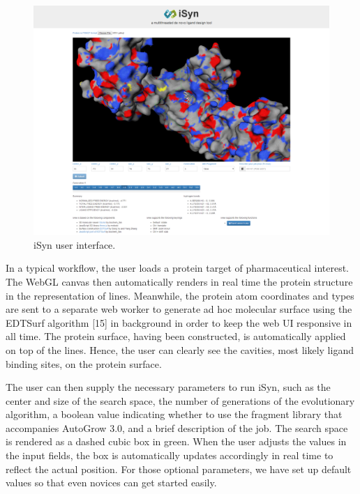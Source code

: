 \begin{figure}
\begin{center}
\includegraphics[width=\linewidth]{../isyn/UI.png}
\end{center}
\caption{iSyn user interface.}
\label{fig:UI}
\end{figure}

In a typical workflow, the user loads a protein target of pharmaceutical interest. The WebGL canvas then automatically renders in real time the protein structure in the representation of lines. Meanwhile, the protein atom coordinates and types are sent to a separate web worker to generate ad hoc molecular surface using the EDTSurf algorithm [15] in background in order to keep the web UI responsive in all time. The protein surface, having been constructed, is automatically applied on top of the lines. Hence, the user can clearly see the cavities, most likely ligand binding sites, on the protein surface.

The user can then supply the necessary parameters to run iSyn, such as the center and size of the search space, the number of generations of the evolutionary algorithm, a boolean value indicating whether to use the fragment library that accompanies AutoGrow 3.0, and a brief description of the job. The search space is rendered as a dashed cubic box in green. When the user adjusts the values in the input fields, the box is automatically updates accordingly in real time to reflect the actual position. For those optional parameters, we have set up default values so that even novices can get started easily.

